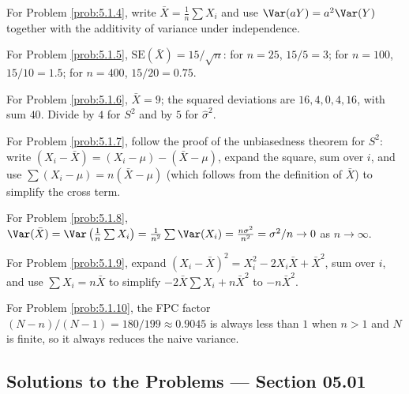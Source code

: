 \begin{sugerencia}
	\label{sug:5.1.4}
	For Problem \ref{prob:5.1.4}, write $\bar{X}=\frac{1}{n}\sum X_i$ and use $\Var(aY)=a^{2}\Var(Y)$ together with the additivity of variance under independence.
\end{sugerencia}

\begin{sugerencia}
	\label{sug:5.1.5}
	For Problem \ref{prob:5.1.5}, $\text{SE}(\bar{X})=15/\sqrt{n}$: for $n=25$, $15/5=3$; for $n=100$, $15/10=1.5$; for $n=400$, $15/20=0.75$.
\end{sugerencia}

\begin{sugerencia}
	\label{sug:5.1.6}
	For Problem \ref{prob:5.1.6}, $\bar{X}=9$; the squared deviations are $16,4,0,4,16$, with sum $40$. Divide by $4$ for $S^{2}$ and by $5$ for $\hat{\sigma}^{2}$.
\end{sugerencia}

\begin{sugerencia}
	\label{sug:5.1.7}
	For Problem \ref{prob:5.1.7}, follow the proof of the unbiasedness theorem for $S^2$: write $(X_i-\bar X)=(X_i-\mu)-(\bar X-\mu)$, expand the square, sum over $i$, and use $\sum(X_i-\mu)=n(\bar X-\mu)$ (which follows from the definition of $\bar X$) to simplify the cross term.
\end{sugerencia}

\begin{sugerencia}
	\label{sug:5.1.8}
	For Problem \ref{prob:5.1.8}, $\Var(\bar{X})=\Var\left(\frac{1}{n}\sum X_i\right)=\frac{1}{n^{2}}\sum\Var(X_i)=\frac{n\sigma^{2}}{n^{2}}=\sigma^{2}/n \to 0$ as $n\to\infty$.
\end{sugerencia}

\begin{sugerencia}
	\label{sug:5.1.9}
	For Problem \ref{prob:5.1.9}, expand $(X_i-\bar X)^2 = X_i^2 - 2X_i\bar X + \bar X^2$, sum over $i$, and use $\sum X_i = n\bar X$ to simplify $-2\bar X\sum X_i + n\bar X^2$ to $-n\bar X^2$.
\end{sugerencia}

\begin{sugerencia}
	\label{sug:5.1.10}
	For Problem \ref{prob:5.1.10}, the FPC factor $(N-n)/(N-1) = 180/199 \approx 0.9045$ is always less than $1$ when $n>1$ and $N$ is finite, so it always reduces the naive variance.
\end{sugerencia}

\subsection*{Solutions to the Problems --- Section 05.01}

